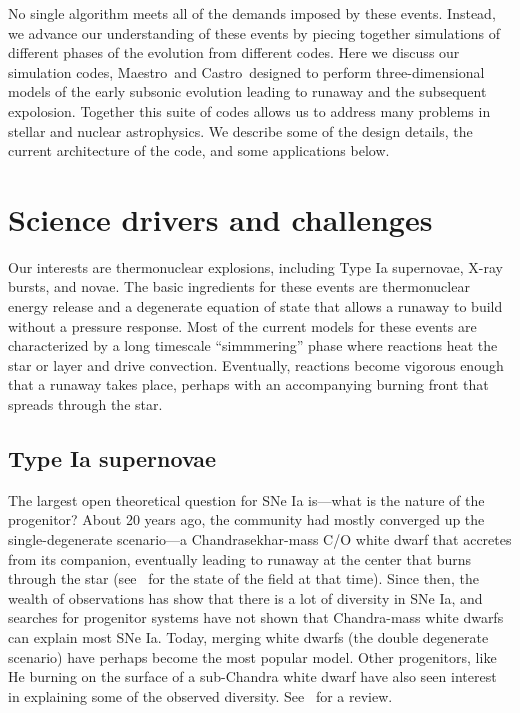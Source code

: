 \documentclass[letterpaper]{jpconf}
\newcommand{\maestro}{{\sffamily Maestro}}
\newcommand{\castro}{{\sffamily Castro}}
\begin{document}
No single algorithm meets all of the demands imposed by these events.
Instead, we advance our understanding of these events by piecing
together simulations of different phases of the evolution from
different codes.  Here we discuss our simulation codes, \maestro\ and
\castro\ designed to perform three-dimensional models of the early
subsonic evolution leading to runaway and the subsequent expolosion.
Together this suite of codes allows us to address many problems in
stellar and nuclear astrophysics.  We describe some of the design
details, the current architecture of the code, and some applications
below.

\section{Science drivers and challenges}

Our interests are thermonuclear explosions, including Type Ia
supernovae, X-ray bursts, and novae.  The basic ingredients for these
events are thermonuclear energy release and a degenerate equation of
state that allows a runaway to build without a pressure response.
Most of the current models for these events are characterized by a
long timescale ``simmmering'' phase where reactions heat the star or
layer and drive convection.  Eventually, reactions become vigorous
enough that a runaway takes place, perhaps with an accompanying
burning front that spreads through the star.

\subsection{Type Ia supernovae}

The largest open theoretical question for SNe Ia is---what is the
nature of the progenitor?  About 20 years ago, the community had
mostly converged up the single-degenerate scenario---a
Chandrasekhar-mass C/O white dwarf that accretes from its companion,
eventually leading to runaway at the center that burns through the
star (see~\cite{hillebrandtniemeyer2000} for the state of the field at
that time).  Since then, the wealth of observations has show that
there is a lot of diversity in SNe Ia, and searches for progenitor
systems have not shown that Chandra-mass white dwarfs can explain most
SNe Ia.  Today, merging white dwarfs (the double degenerate scenario)
have perhaps become the most popular model.  Other progenitors, like
He burning on the surface of a sub-Chandra white dwarf have also seen
interest in explaining some of the observed diversity.
See~\cite{araa-maoz} for a review.
\end{document}
